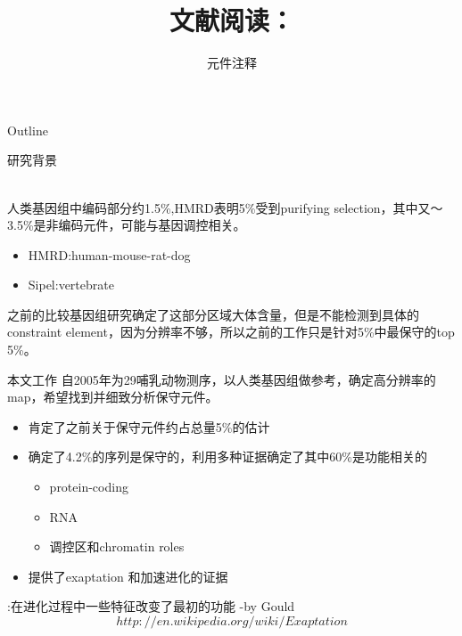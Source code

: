 \documentclass{beamer}
\begin{document}
{
\begin{frame}
    \title{文献阅读：{\color{red}{A high-resolution map of human evolutionary constraint using 29 mammals}}}
    \author{元件注释}
    \maketitle
\end{frame}
}

\begin{frame}{Outline}                       %
\tableofcontents
\end{frame}
\begin{frame}{研究背景}

{\color{red}{已知:}}\\
人类基因组中编码部分约1.5\%,HMRD表明5\%受到purifying selection，其中又～3.5\%是非编码元件，可能与基因调控相关。\\
{\color{red}{已有研究：}}
\begin{itemize}				
\item HMRD:human-mouse-rat-dog
\item Sipel:vertebrate 
\end{itemize}
之前的比较基因组研究确定了这部分区域大体含量，但是不能检测到具体的constraint element，因为分辨率不够，所以之前的工作只是针对5\%中最保守的top 5\%。
\end{frame}

\begin{frame}{本文工作}
自2005年为29哺乳动物测序，以人类基因组做参考，确定高分辨率的map，希望找到并细致分析保守元件。
\begin{itemize}
\item 肯定了之前关于保守元件约占总量5\%的估计
\item 确定了4.2\%的序列是保守的，利用多种证据确定了其中60\%是功能相关的
	\begin{itemize}
	\item	protein-coding 
	\item RNA
	\item 调控区和chromatin roles
	\end{itemize}
\item 提供了exaptation 和加速进化的证据
\end{itemize}
{\color{red}{Expation}}:在进化过程中一些特征改变了最初的功能 -by Gould\\
$$http://en.wikipedia.org/wiki/Exaptation$$								
\end{frame}
					
\end{document}
